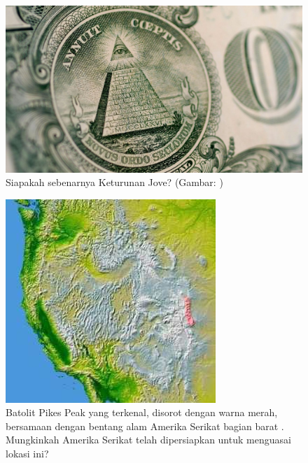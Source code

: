\documentclass[10pt,twocolumn,letterpaper]{article}
\begin{document}
\begin{figure}[t]
\begin{center}
   \includegraphics[width=1\linewidth]{illuminati.jpg}
\end{center}
   \caption{Siapakah sebenarnya Keturunan Jove? (Gambar: \cite{35})}
\label{fig:10}
\label{fig:onecol}
\end{figure}

\begin{figure}[t]

\begin{center}
   \includegraphics[width=1\linewidth]{pike.jpg}
\end{center}
   \caption{Batolit Pikes Peak yang terkenal, disorot dengan warna merah, bersamaan dengan bentang alam Amerika Serikat bagian barat \cite{36}. Mungkinkah Amerika Serikat telah dipersiapkan untuk menguasai lokasi ini?}
\label{fig:11}
\label{fig:onecol}
\end{figure}
\end{document}
